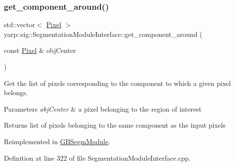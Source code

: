 \subsubsection{\texorpdfstring{get\_component\_around()}{get\_component\_around()}}
{\footnotesize\ttfamily std\+::vector$<$ \mbox{\hyperlink{classyarp_1_1sig_1_1Pixel}{Pixel}} $>$ yarp\+::sig\+::\+Segmentation\+Module\+Interface\+::get\+\_\+component\+\_\+around (\begin{DoxyParamCaption}\item[{const \mbox{\hyperlink{classyarp_1_1sig_1_1Pixel}{Pixel}} \&}]{obj\+Center }\end{DoxyParamCaption})\hspace{0.3cm}{\ttfamily [virtual]}}



Get the list of pixels corresponding to the component to which a given pixel belongs. 


\begin{DoxyParams}{Parameters}
{\em obj\+Center} & a pixel belonging to the region of interest \\
\hline
\end{DoxyParams}
\begin{DoxyReturn}{Returns}
list of pixels belonging to the same component as the input pixels 
\end{DoxyReturn}


Reimplemented in \mbox{\hyperlink{classGBSegmModule_a0b63c53513e67c4f126e29cf7f28ad53}{G\+B\+Segm\+Module}}.



Definition at line 322 of file Segmentation\+Module\+Interface.\+cpp.


\begin{DoxyCode}{0}

\end{DoxyCode}
\mbox{\label{classyarp_1_1sig_1_1SegmentationModuleInterface_a91f3d872a48599337d1d2f365ac4c31e}} 
